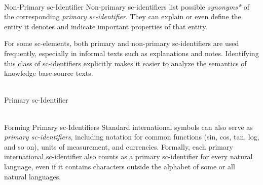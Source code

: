 \begin{frame}{\\Non-Primary sc-Identifier}
	\topline
	\justifying
	Non-primary sc-identifiers list possible \textit{synonyms*} of the corresponding \textit{primary sc-identifier}. They can explain or even define the entity it denotes and indicate important properties of that entity.

	\bigskip
	For some sc-elements, both primary and non-primary sc-identifiers are used frequently, especially in informal texts such as explanations and notes. Identifying this class of sc-identifiers explicitly makes it easier to analyze the semantics of knowledge base source texts.
\end{frame}

\begin{frame}{\\Primary sc-Identifier}
	\topline
	\justifying
	\begin{SCn}
		\begin{scnindent}
		\end{scnindent}
	\end{SCn}

\end{frame}

\begin{frame}{\\Forming Primary sc-Identifiers}
	\topline
	\justifying
	Standard international symbols can also serve as \textit{primary sc-identifiers}, including notation for common functions (sin, cos, tan, log, and so on), units of measurement, and currencies. Formally, each primary international sc-identifier also counts as a primary sc-identifier for every natural language, even if it contains characters outside the alphabet of some or all natural languages.
\end{frame}

